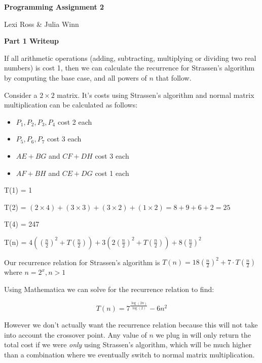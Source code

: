 \documentclass[12pt]{article}
\begin{document}
\begin{center} \textbf{Programming Assignment 2} \end{center}
 \vspace{-7mm} 
\begin{flushright} Lexi Ross \& Julia Winn  \end{flushright}

 \vspace{-4mm} 
\noindent \textbf{Part 1 Writeup}
\medskip

\noindent If all arithmetic operations (adding, subtracting, multiplying or dividing two real numbers) is cost 1, then we can calculate the recurrence for Strassen's algorithm by computing the base case, and all powers of $n$ that follow.
\medskip

\noindent Consider a $2 \times 2$ matrix.  It's costs using Strassen's algorithm and normal matrix multiplication can be calculated as follows:

\begin{itemize}
\item $P_1, P_2, P_3, P_4$ cost 2 each
\item $P_5, P_6, P_7$ cost 3 each
\item $AE + BG$ and $CF + DH$ cost 3 each
\item $AF + BH$ and $CE + DG$ cost 1 each
\end{itemize}

\noindent T(1) = 1
\medskip

\noindent T(2) = $(2 \times 4) + (3 \times 3) + (3 \times 2) + (1 \times 2)= 8 + 9 + 6 + 2 = 25$
\medskip

\noindent T(4) =  247
\medskip

\noindent T(n) = $4((\frac{n}{2})^2 + T(\frac{n}{2})) + 3(2(\frac{n}{2})^2 + T(\frac{n}{2})) + 8(\frac{n}{2})^2$
\bigskip

\noindent Our recurrence relation for Strassen's algorithm is $T(n) = 18(\frac{n}{2})^2 + 7\cdot T(\frac{n}{2})$ where $n=2^x, n >1$
\bigskip

\noindent Using Mathematica we can solve for the recurrence relation to find:

$$T(n) = 7^{\frac{\log(2n)}{\log(2)}} - 6n^2$$

\noindent However we don't actually want the recurrence relation because this will not take into account the crossover point.  Any value of $n$ we plug in will only return the total cost if we were \emph{only} using Strassen's algorithm, which will be much higher than a combination where we eventually switch to normal matrix multiplication.
\bigskip
\end{document}
